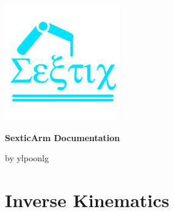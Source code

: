 \documentclass{article}
\begin{document}

\begin{center}
	\vspace*{5cm}
	\vfill
	
	\includegraphics[width=5cm]{../res/logo.png} \\
	\vspace*{0.8cm}
	
	{\huge \textbf{SexticArm Documentation}} \\
	\vspace*{3cm}
	
	{\small by ylpoonlg}	
		
	\vfill
	\vspace*{5cm}
\end{center}



\newpage

\section{Inverse Kinematics}
\end{document}
